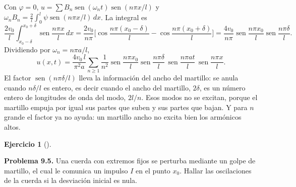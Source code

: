 \documentclass[
  spanish,
  a4paper,
]{scrbook}
\theoremstyle{definition}
\theoremstyle{plain}
\theoremstyle{definition}
\theoremstyle{plain}
\theoremstyle{definition}
\newtheorem{exercise}{Ejercicio}[chapter]
\theoremstyle{remark}
\begin{document}
\begin{tcolorbox}[enhanced jigsaw, arc=.35mm, bottomrule=.15mm, bottomtitle=1mm, breakable, colback=white, colbacktitle=quarto-callout-tip-color!10!white, colframe=quarto-callout-tip-color-frame, coltitle=black, left=2mm, leftrule=.75mm, opacityback=0, opacitybacktitle=0.6, rightrule=.15mm, title=\textcolor{quarto-callout-tip-color}{\faLightbulb}\hspace{0.5em}{Solución}, titlerule=0mm, toprule=.15mm, toptitle=1mm]

Con \(\varphi = 0\),
\(u = \sum B_n\operatorname{sen}(\omega_nt)\operatorname{sen}(n\pi x/l)\)
y
\(\omega_nB_n = \tfrac2l\int_0^l\psi\operatorname{sen}(n\pi x/l)\,dx\).
La integral es \[
\frac{2v_0}{l}\int_{x_0-\delta}^{x_0+\delta}\operatorname{sen}\frac{n\pi x}{l}\,dx
= \frac{2v_0}{n\pi}\Big[\cos\frac{n\pi(x_0-\delta)}{l} - \cos\frac{n\pi(x_0+\delta)}{l}\Big]
= \frac{4v_0}{n\pi}\operatorname{sen}\frac{n\pi x_0}{l}\operatorname{sen}\frac{n\pi\delta}{l}.
\] Dividiendo por \(\omega_n = n\pi a/l\), \[
u(x,t) = \frac{4v_0\,l}{\pi^2a}\sum_{n\ge1}\frac{1}{n^2}\operatorname{sen}\frac{n\pi x_0}{l}\operatorname{sen}\frac{n\pi\delta}{l}\,\operatorname{sen}\frac{n\pi at}{l}\,\operatorname{sen}\frac{n\pi x}{l}.
\] El factor \(\operatorname{sen}(n\pi\delta/l)\) lleva la información
del ancho del martillo: se anula cuando \(n\delta/l\) es entero, es
decir cuando el ancho del martillo, \(2\delta\), es un número entero de
longitudes de onda del modo, \(2l/n\). Esos modos no se excitan, porque
el martillo empuja por igual sus partes que suben y sus partes que
bajan. Y para \(n\) grande el factor ya no ayuda: un martillo ancho no
excita bien los armónicos altos.

\end{tcolorbox}

\begin{exercise}[]\protect\hypertarget{exr-hip-p5}{}\label{exr-hip-p5}

\textbf{Problema 9.5.} Una cuerda con extremos fijos se perturba
mediante un golpe de martillo, el cual le comunica un impulso \(I\) en
el punto \(x_0\). Hallar las oscilaciones de la cuerda si la desviación
inicial es nula.

\end{exercise}
\end{document}
